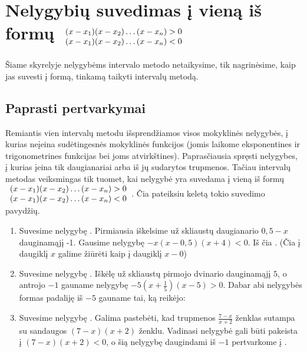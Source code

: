 \documentclass[a4paper,png]{article}
\begin{document}
\section[]{Nelygybių suvedimas į vieną iš formų \small{$\begin{array}l(x-x_1)(x-x_2)\dots (x-x_n)>0 \\ (x-x_1)(x-x_2)\dots (x-x_n)<0\end{array}$}}
Šiame skyrelyje nelygybėms intervalo metodo netaikysime, tik nagrinėsime, kaip jas suvesti į formą, tinkamą taikyti intervalų metodą.
\subsection*{Paprasti pertvarkymai}
Remiantis vien intervalų metodu išsprendžiamos visos mokyklinės nelygybės, į kurias neįeina sudėtingesnės mokyklinės funkcijos (jomis laikome eksponentines ir trigonometrines funkcijas bei joms atvirkštines). Paprasčiausia spręsti nelygybes, į kurias įeina tik daugianariai arba iš jų sudarytos trupmenos. Tačiau intervalų metodas veiksmingas tik tuomet, kai nelygybė yra suvedama į vieną iš formų {\small{$\begin{array}l(x-x_1)(x-x_2)\dots (x-x_n)>0 \\ (x-x_1)(x-x_2)\dots (x-x_n)<0\end{array}$}}. Čia pateiksiu keletą tokio suvedimo pavydžių.
\begin{enumerate}
\item Suvesime nelygybę . Pirmiausia iškelsime už skliaustų daugianario $0,5-x$ dauginamąjį -1. Gausime nelygybę $-x(x-0,5)(x+4)<0$. Iš čia . (Čia į daugiklį $x$ galime žiūrėti kaip į daugiklį $x-0$)
\item Suvesime nelygybę . Iškėlę už skliaustų pirmojo dvinario dauginamąjį $5$, o antrojo $-1$ gauname nelygybę $-5\left(x+\frac{1}{5}\right)(x-5)>0$. Dabar abi nelygybės formas padaliję iš $-5$ gauname tai, ką reikėjo:
\item Suvesime nelygybę . Galima pastebėti, kad trupmenos $\frac{7-x}{x+2}$ ženklas sutampa su sandaugos $(7-x)(x+2)$ ženklu. Vadinasi nelygybė gali būti pakeista į $(7-x)(x+2)<0$, o šią nelygybę daugindami iš $-1$ pertvarkome į .
\end{enumerate}
\end{document}
